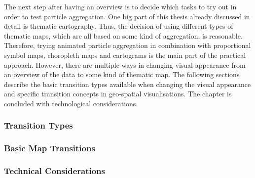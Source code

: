 The next step after having an overview is to decide which tasks to try out in order to test particle aggregation. One big part of this thesis already discussed in detail is thematic cartography. Thus, the decision of using different types of thematic maps, which are all based on some kind of aggregation, is reasonable. Therefore, trying animated particle aggregation in combination with proportional symbol maps, choropleth maps and cartograms is the main part of the practical approach. However, there are multiple ways in changing visual appearance from an overview of the data to some kind of thematic map. The following sections describe the basic transition types available when changing the visual appearance and specific transition concepts in geo-spatial visualisations. The chapter is concluded with technological considerations.

\subsubsection{Transition Types}


\subsubsection{Basic Map Transitions}


\subsubsection{Technical Considerations}


